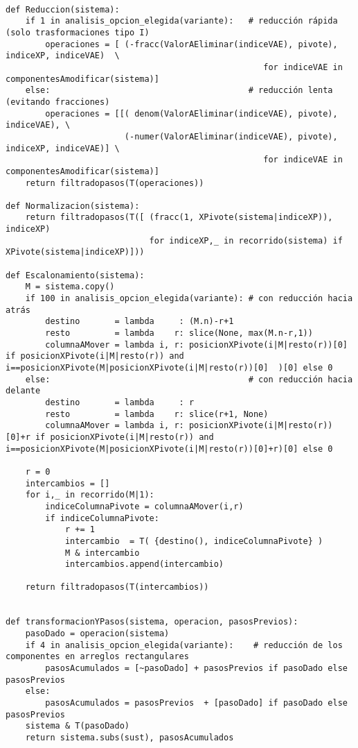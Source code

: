 \documentclass[11pt]{report}
\begin{document}
\begin{verbatim}
    
def Reduccion(sistema):
    if 1 in analisis_opcion_elegida(variante):   # reducción rápida (solo trasformaciones tipo I)
        operaciones = [ (-fracc(ValorAEliminar(indiceVAE), pivote), indiceXP, indiceVAE)  \
                                                    for indiceVAE in componentesAmodificar(sistema)]
    else:                                        # reducción lenta (evitando fracciones)
        operaciones = [[( denom(ValorAEliminar(indiceVAE), pivote),           indiceVAE), \
                        (-numer(ValorAEliminar(indiceVAE), pivote), indiceXP, indiceVAE)] \
                                                    for indiceVAE in componentesAmodificar(sistema)]
    return filtradopasos(T(operaciones))

def Normalizacion(sistema):
    return filtradopasos(T([ (fracc(1, XPivote(sistema|indiceXP)), indiceXP)
                             for indiceXP,_ in recorrido(sistema) if XPivote(sistema|indiceXP)]))

def Escalonamiento(sistema):
    M = sistema.copy()
    if 100 in analisis_opcion_elegida(variante): # con reducción hacia atrás
        destino       = lambda     : (M.n)-r+1
        resto         = lambda    r: slice(None, max(M.n-r,1))
        columnaAMover = lambda i, r: posicionXPivote(i|M|resto(r))[0]   if posicionXPivote(i|M|resto(r)) and i==posicionXPivote(M|posicionXPivote(i|M|resto(r))[0]  )[0] else 0
    else:                                        # con reducción hacia delante
        destino       = lambda     : r
        resto         = lambda    r: slice(r+1, None)
        columnaAMover = lambda i, r: posicionXPivote(i|M|resto(r))[0]+r if posicionXPivote(i|M|resto(r)) and i==posicionXPivote(M|posicionXPivote(i|M|resto(r))[0]+r)[0] else 0

    r = 0
    intercambios = []
    for i,_ in recorrido(M|1):
        indiceColumnaPivote = columnaAMover(i,r)
        if indiceColumnaPivote:
            r += 1
            intercambio  = T( {destino(), indiceColumnaPivote} )
            M & intercambio
            intercambios.append(intercambio)
            
    return filtradopasos(T(intercambios))


def transformacionYPasos(sistema, operacion, pasosPrevios):
    pasoDado = operacion(sistema)
    if 4 in analisis_opcion_elegida(variante):    # reducción de los componentes en arreglos rectangulares
        pasosAcumulados = [~pasoDado] + pasosPrevios if pasoDado else pasosPrevios
    else:
        pasosAcumulados = pasosPrevios  + [pasoDado] if pasoDado else pasosPrevios
    sistema & T(pasoDado)
    return sistema.subs(sust), pasosAcumulados



\end{verbatim}
\end{document}
